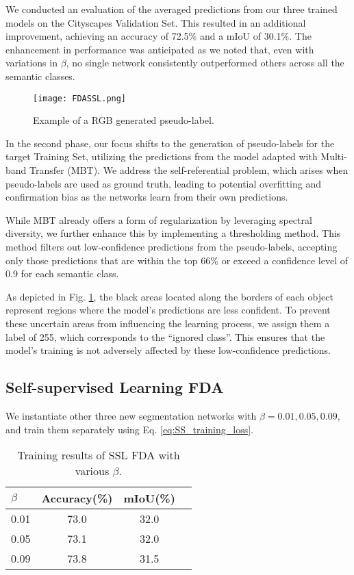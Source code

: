 \documentclass[10pt,twocolumn,letterpaper]{article}
\begin{document}
We conducted an evaluation of the averaged predictions from our three trained models on the Cityscapes Validation Set. This resulted in an additional improvement, achieving an accuracy of 72.5\% and a mIoU of 30.1\%. The enhancement in performance was anticipated as we noted that, even with variations in $\beta$, no single network consistently outperformed others across all the semantic classes.\\

\begin{figure}[h]
    \centering
    \texttt{[image: FDASSL.png]}
    \caption{Example of a RGB generated pseudo-label.}
    \label{fig:pseudolabel}
\end{figure}

In the second phase, our focus shifts to the generation of pseudo-labels for the target Training Set, utilizing the predictions from the model adapted with Multi-band Transfer (MBT). We address the self-referential problem, which arises when pseudo-labels are used as ground truth, leading to potential overfitting and confirmation bias as the networks learn from their own predictions.

While MBT already offers a form of regularization by leveraging spectral diversity, we further enhance this by implementing a thresholding method. This method filters out low-confidence predictions from the pseudo-labels, accepting only those predictions that are within the top 66\% or exceed a confidence level of 0.9 for each semantic class.

As depicted in Fig. \ref{fig:pseudolabel}, the black areas located along the borders of each object represent regions where the model’s predictions are less confident. To prevent these uncertain areas from influencing the learning process, we assign them a label of 255, which corresponds to the “ignored class”. This ensures that the model’s training is not adversely affected by these low-confidence predictions.

\subsection{Self-supervised Learning FDA}

We instantiate other three new segmentation networks with $\beta = 0.01, 0.05, 0.09$, and train them separately using Eq. \eqref{eq:SS_training_loss}.

\begin{table}[h]
  \centering
  \begin{tabular}{@{}lccc@{}}
  \toprule
  $\beta$ & Accuracy(\%) & mIoU(\%) \\
  \midrule
    0.01 & 73.0 & 32.0 \\
    0.05 & 73.1 & 32.0 \\
    0.09 & 73.8 & 31.5 \\
    \bottomrule
  \end{tabular}
  \caption{Training results of SSL FDA with various $\beta$.}
  \label{tab:ss_fda}
\end{table}
\end{document}
